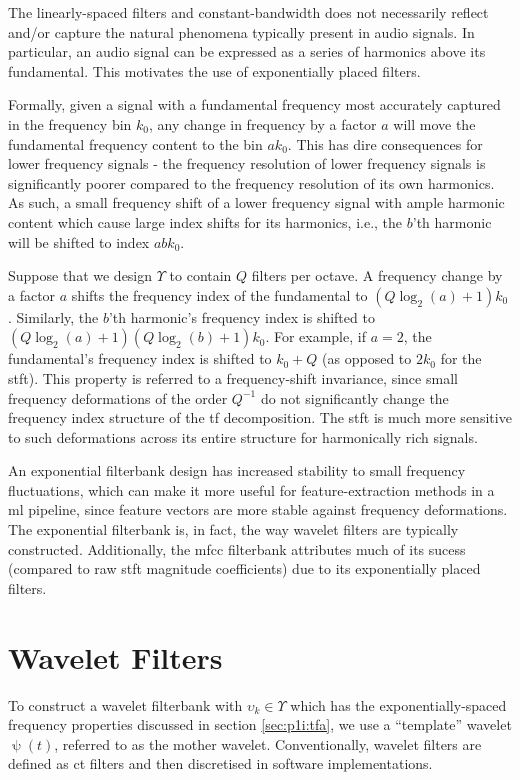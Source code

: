 The linearly-spaced filters and constant-bandwidth does not necessarily reflect and/or capture the natural phenomena typically present in audio signals. In particular, an audio signal can be expressed as a series of harmonics above its fundamental. This motivates the use of exponentially placed filters.

Formally, given a signal with a fundamental frequency most accurately captured in the frequency bin $k_0$, any change in frequency by a factor $a$ will move the fundamental frequency content to the bin $a k_0$. This has dire consequences for lower frequency signals - the frequency resolution of lower frequency signals is significantly poorer compared to the frequency resolution of its own harmonics. As such, a small frequency shift of a lower frequency signal with ample harmonic content which cause large index shifts for its harmonics, i.e., the $b$'th harmonic will be shifted to index $a b k_0$.

Suppose that we design $\Upsilon$ to contain $Q$ filters per octave. A frequency change by a factor $a$ shifts the frequency index of the fundamental to $(Q\log_2 (a) + 1) k_0$. Similarly, the $b$'th harmonic's frequency index is shifted to $(Q\log_2 (a) + 1) (Q\log_2 (b) + 1) k_0$. For example, if $a=2$, the fundamental's frequency index is shifted to $k_0 + Q$ (as opposed to $2 k_0$ for the \ac{stft}). This property is referred to a frequency-shift invariance, since small frequency deformations of the order $Q^{-1}$ do not significantly change the frequency index structure of the \ac{tf} decomposition. The \ac{stft} is much more sensitive to such deformations across its entire structure for harmonically rich signals.

An exponential filterbank design has increased stability to small frequency fluctuations, which can make it more useful for feature-extraction methods in a \ac{ml} pipeline, since feature vectors are more stable against frequency deformations. The exponential filterbank is, in fact, the way wavelet filters are typically constructed. Additionally, the \ac{mfcc} filterbank attributes much of its sucess (compared to raw \ac{stft} magnitude coefficients) due to its exponentially placed filters.

\section{Wavelet Filters}
\label{sec:p1i:wavelets}

To construct a wavelet filterbank with $\upsilon_k \in \Upsilon$ which has the exponentially-spaced frequency properties discussed in section \ref{sec:p1i:tfa}, we use a ``template'' wavelet $\uppsi(t)$, referred to as the mother wavelet. Conventionally, wavelet filters are defined as \ac{ct} filters and then discretised in software implementations. 

